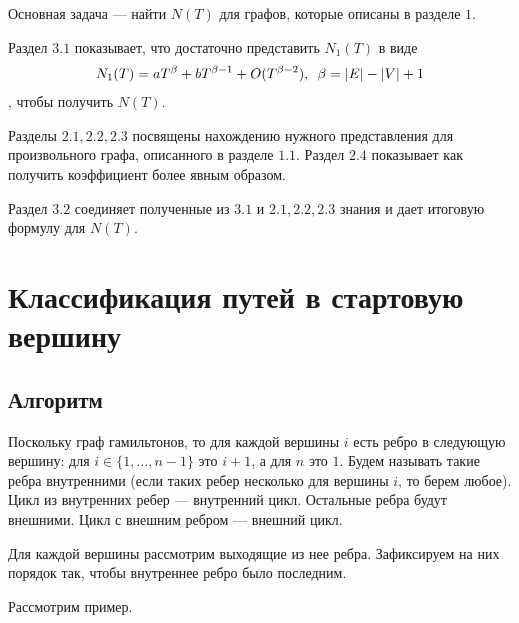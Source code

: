 \documentclass{article}
\newcommand{\squad}{
    \hspace{0.5em}
}
\begin{document}
Основная задача --- найти $N(T)$ для графов, которые описаны в разделе $1$.

Раздел $3.1$ показывает, что достаточно представить $N_{1}(T)$ в виде
\begin{gather*}
N_{1}(T) = aT^{\beta} + bT^{\beta - 1} + O(T^{\beta - 2}), \squad \beta = |E| - |V| + 1     
\end{gather*} 
, чтобы получить $N(T)$.

Разделы $2.1, 2.2, 2.3$ посвящены нахождению нужного представления для произвольного графа, описанного в разделе $1.1$. Раздел $2.4$ показывает как получить коэффициент более явным образом.

Раздел $3.2$ соединяет полученные из $3.1$ и $2.1, 2.2, 2.3$ знания и дает итоговую формулу для $N(T)$.


\section{Классификация путей в стартовую вершину}

\subsection{Алгоритм}

Поскольку граф гамильтонов, то для каждой вершины $i$ есть ребро в следующую вершину: для $i \in \{1, \ldots, n - 1\}$ это $i + 1$, а для $n$ это $1$. 
Будем называть такие ребра внутренними (если таких ребер несколько для вершины $i$, то берем любое). Цикл из внутренних ребер --- внутренний цикл. Остальные ребра будут внешними. Цикл с внешним ребром --- внешний цикл.

Для каждой вершины рассмотрим выходящие из нее ребра. Зафиксируем на них порядок так, чтобы внутреннее ребро было последним.

Рассмотрим пример.
\end{document}
